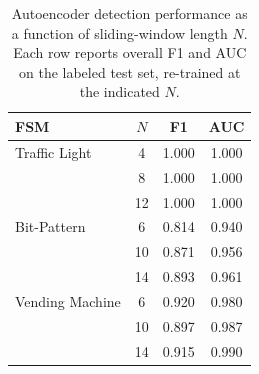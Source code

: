 \begin{table}[t]
\centering
\caption{Autoencoder detection performance as a function of sliding-window
length $N$. Each row reports overall F1 and AUC on the labeled test set,
re-trained at the indicated $N$.}
\label{tab:sensitivity}
\begin{tabular}{lccc}
\hline
FSM & $N$ & F1 & AUC \\
\hline
Traffic Light    &  4 & 1.000 & 1.000 \\
                 &  8 & 1.000 & 1.000 \\
                 & 12 & 1.000 & 1.000 \\
\hline
Bit-Pattern      &  6 & 0.814 & 0.940 \\
                 & 10 & 0.871 & 0.956 \\
                 & 14 & 0.893 & 0.961 \\
\hline
Vending Machine  &  6 & 0.920 & 0.980 \\
                 & 10 & 0.897 & 0.987 \\
                 & 14 & 0.915 & 0.990 \\
\hline
\end{tabular}
\end{table}
